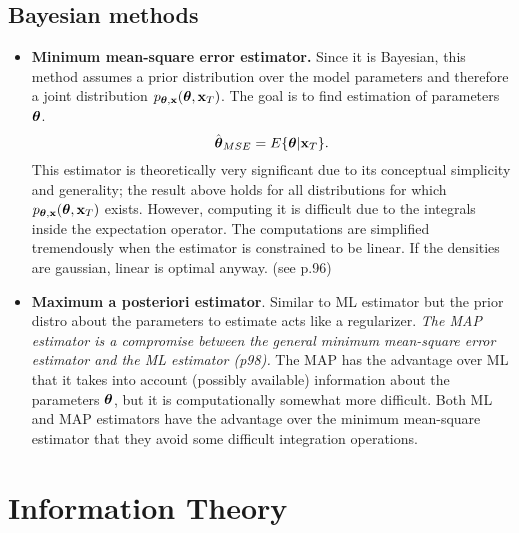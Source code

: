 \documentclass[a4paper, one	side]{book}
\begin{document}
\section{Bayesian methods}
\begin{itemize}
\item \textbf{Minimum mean-square error estimator.} Since it is Bayesian, this method assumes a prior distribution over the model parameters and therefore a joint distribution $p_{\boldsymbol{\theta},\mathbf{x}}(\boldsymbol{\theta},\mathbf{x}_T)$. The goal is to find estimation of parameters $\boldsymbol{\theta}$.%
$$ \hat{\boldsymbol{\theta}}_{MSE} = E\{\boldsymbol{\theta}|\mathbf{x}_T\} .$$
%
This estimator is theoretically very significant due to its conceptual simplicity and generality; the result above holds for all distributions for which $p_{\boldsymbol{\theta},\mathbf{x}}(\boldsymbol{\theta},\mathbf{x}_T)$ exists. However, computing it is difficult due to the integrals inside the expectation operator.
%
The computations are simplified tremendously when the estimator is constrained to be linear. If the densities are gaussian, linear is optimal anyway. (see p.96)
%
\item \textbf{Maximum a posteriori estimator}. Similar to ML estimator but the prior distro about the parameters to estimate acts like a regularizer. \textit{The MAP estimator is a compromise between the general minimum mean-square error estimator and the ML estimator (p98).} The MAP has the advantage over ML that it takes into account (possibly available) information about the parameters $\boldsymbol{\theta}$, but it is computationally somewhat more difficult. Both ML and MAP estimators have the advantage over the minimum mean-square estimator that they avoid some difficult integration operations. 
\end{itemize}









\chapter{Information Theory}
\end{document}

